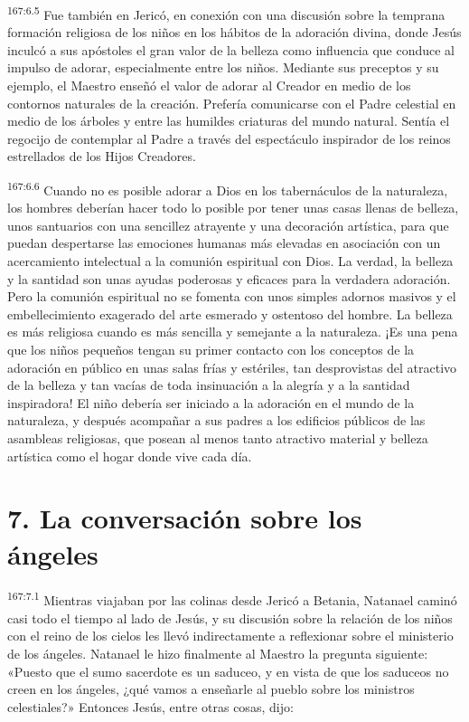 \par
\textsuperscript{167:6.5} Fue también en Jericó, en conexión con una discusión sobre la temprana formación religiosa de los niños en los hábitos de la adoración divina, donde Jesús inculcó a sus apóstoles el gran valor de la belleza como influencia que conduce al impulso de adorar, especialmente entre los niños. Mediante sus preceptos y su ejemplo, el Maestro enseñó el valor de adorar al Creador en medio de los contornos naturales de la creación. Prefería comunicarse con el Padre celestial en medio de los árboles y entre las humildes criaturas del mundo natural. Sentía el regocijo de contemplar al Padre a través del espectáculo inspirador de los reinos estrellados de los Hijos Creadores.

\par
\textsuperscript{167:6.6} Cuando no es posible adorar a Dios en los tabernáculos de la naturaleza, los hombres deberían hacer todo lo posible por tener unas casas llenas de belleza, unos santuarios con una sencillez atrayente y una decoración artística, para que puedan despertarse las emociones humanas más elevadas en asociación con un acercamiento intelectual a la comunión espiritual con Dios. La verdad, la belleza y la santidad son unas ayudas poderosas y eficaces para la verdadera adoración. Pero la comunión espiritual no se fomenta con unos simples adornos masivos y el embellecimiento exagerado del arte esmerado y ostentoso del hombre. La belleza es más religiosa cuando es más sencilla y semejante a la naturaleza. ¡Es una pena que los niños pequeños tengan su primer contacto con los conceptos de la adoración en público en unas salas frías y estériles, tan desprovistas del atractivo de la belleza y tan vacías de toda insinuación a la alegría y a la santidad inspiradora! El niño debería ser iniciado a la adoración en el mundo de la naturaleza, y después acompañar a sus padres a los edificios públicos de las asambleas religiosas, que posean al menos tanto atractivo material y belleza artística como el hogar donde vive cada día.

\section*{7. La conversación sobre los ángeles}
\par
\textsuperscript{167:7.1} Mientras viajaban por las colinas desde Jericó a Betania, Natanael caminó casi todo el tiempo al lado de Jesús, y su discusión sobre la relación de los niños con el reino de los cielos les llevó indirectamente a reflexionar sobre el ministerio de los ángeles. Natanael le hizo finalmente al Maestro la pregunta siguiente: «Puesto que el sumo sacerdote es un saduceo, y en vista de que los saduceos no creen en los ángeles, ¿qué vamos a enseñarle al pueblo sobre los ministros celestiales?» Entonces Jesús, entre otras cosas, dijo:

